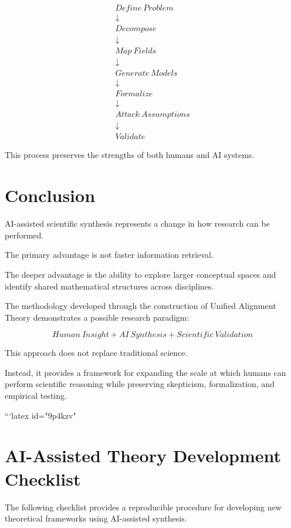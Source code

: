 \documentclass[11pt]{article}
\begin{document}
\[
\boxed{
\begin{array}{c}
Define\ Problem
\\
\downarrow
\\
Decompose
\\
\downarrow
\\
Map\ Fields
\\
\downarrow
\\
Generate\ Models
\\
\downarrow
\\
Formalize
\\
\downarrow
\\
Attack\ Assumptions
\\
\downarrow
\\
Validate
\end{array}
}
\]


This process preserves the strengths of both humans and AI systems.



\section{Conclusion}


AI-assisted scientific synthesis represents a change in how research can
be performed.


The primary advantage is not faster information retrieval.


The deeper advantage is the ability to explore larger conceptual spaces
and identify shared mathematical structures across disciplines.


The methodology developed through the construction of Unified Alignment
Theory demonstrates a possible research paradigm:


\[
Human\ Insight
+
AI\ Synthesis
+
Scientific\ Validation
\]


This approach does not replace traditional science.


Instead, it provides a framework for expanding the scale at which humans
can perform scientific reasoning while preserving skepticism,
formalization, and empirical testing.

```latex id="9p4kzv"
\appendix


\section{AI-Assisted Theory Development Checklist}


The following checklist provides a reproducible procedure for developing
new theoretical frameworks using AI-assisted synthesis.
\end{document}
